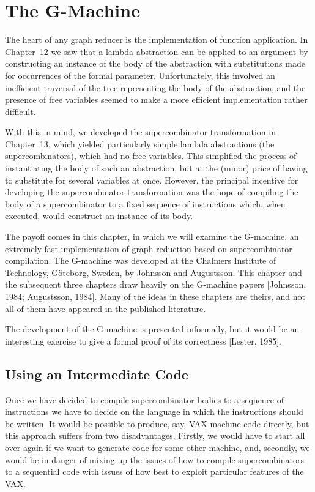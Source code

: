 \chapter{The G-Machine}
\vspace{2cm}

The heart of any graph reducer is the implementation of function application.
In Chapter~12 we saw that a lambda abstraction can be applied to an argument
by constructing an instance of the body of the abstraction with substitutions
made for occurrences of the formal parameter. Unfortunately, this involved
an inefficient traversal of the tree representing the body of the abstraction,
and the presence of free variables seemed to make a more efficient implementation rather difficult.

With this in mind, we developed the supercombinator transformation in
Chapter~13, which yielded particularly simple lambda abstractions (the
supercombinators), which had no free variables. This simplified the process of
instantiating the body of such an abstraction, but at the (minor) price of
having to substitute for several variables at once. However, the principal
incentive for developing the supercombinator transformation was the hope of
compiling the body of a supercombinator to a fixed sequence of instructions
which, when executed, would construct an instance of its body.

The payoff comes in this chapter, in which we will examine the G-machine,
an extremely fast implementation of graph reduction based on
supercombinator compilation. The G-machine was developed at the Chalmers
Institute of Technology, G\"oteborg, Sweden, by Johnsson and Augustsson.
This chapter and the subsequent three chapters draw heavily on the
G-machine papers [Johnsson, 1984; Augustsson, 1984]. Many of the ideas in
these chapters are theirs, and not all of them have appeared in the published
literature.

The development of the G-machine is presented informally, but it would be
an interesting exercise to give a formal proof of its correctness [Lester, 1985].

\section{Using an Intermediate Code}

Once we have decided to compile supercombinator bodies to a sequence of
instructions we have to decide on the language in which the instructions
should be written. It would be possible to produce, say, VAX machine code
directly, but this approach suffers from two disadvantages. Firstly, we would
have to start all over again if we want to generate code for some other
machine, and, secondly, we would be in danger of mixing up the issues of how
to compile supercombinators to a sequential code with issues of how best to
exploit particular features of the VAX.

